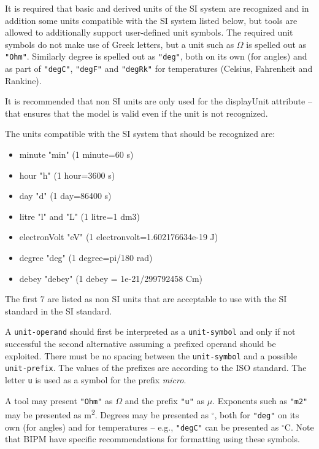 It is required that basic and derived units of the SI system are recognized and in addition some units compatible with the SI system listed below, but tools are allowed to additionally support user-defined unit symbols.
The required unit symbols do not make use of Greek letters, but a unit such as $\Omega$ is spelled out as \lstinline!"Ohm"!.
Similarly degree is spelled out as \lstinline!"deg"!, both on its own (for angles) and as part of \lstinline!"degC"!, \lstinline!"degF"! and \lstinline!"degRk"! for temperatures (Celsius, Fahrenheit and Rankine).

It is recommended that non SI units are only used for the displayUnit attribute -- that ensures that the model is valid even if the unit is not recognized.

The units compatible with the SI system that should be recognized are:
\begin{itemize}
\item minute "min" (1 minute=60 s)
\item hour "h" (1 hour=3600 s)
\item day "d" (1 day=86400 s)
\item litre "l" and "L" (1 litre=1 dm3)
\item electronVolt "eV" (1 electronvolt=1.602176634e-19 J)
\item degree "deg" (1 degree=pi/180 rad)
\item debey "debey" (1 debey = 1e-21/299792458 Cm)
\end{itemize}
The first 7 are listed as non SI units that are acceptable to use with the SI standard in the SI standard.

A \lstinline[language=grammar]!unit-operand! should first be interpreted as a \lstinline[language=grammar]!unit-symbol! and only if not successful the second alternative assuming a prefixed operand should be exploited.
There must be no spacing between the \lstinline[language=grammar]!unit-symbol! and a possible \lstinline[language=grammar]!unit-prefix!.
The values of the prefixes are according to the ISO standard.
The letter \lstinline!u! is used as a symbol for the prefix \emph{micro}.

\begin{nonnormative}
A tool may present \lstinline!"Ohm"! as $\Omega$ and the prefix \lstinline!"u"! as $\mu$.
Exponents such as \lstinline!"m2"! may be presented as m\textsuperscript{2}.
Degrees may be presented as $^{\circ}$, both for \lstinline!"deg"! on its own (for angles) and for temperatures -- e.g., \lstinline!"degC"! can be presented as $^{\circ}$C.
Note that BIPM have specific recommendations for formatting using these symbols.
\end{nonnormative}


